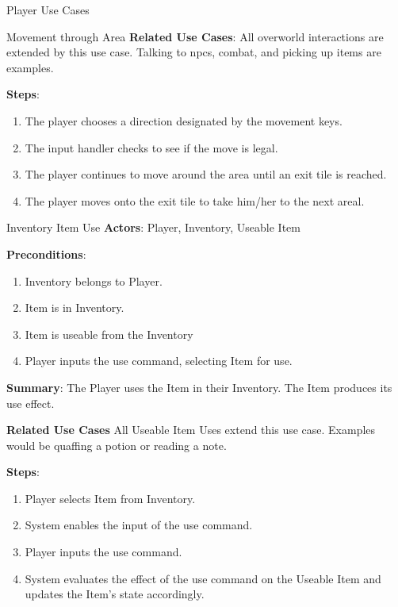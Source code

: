 \documentclass[12pt]{report}
\begin{document}
\begin{section}{Player Use Cases}
\begin{subsection}{Movement through Area}
      \textbf{Related Use Cases}:
      All overworld interactions are extended by this use case. Talking to npcs, combat, and picking up items are examples.

      \textbf{Steps}:
      \begin{enumerate}
        \item The player chooses a direction designated by the movement keys.
        \item The input handler checks to see if the move is legal.
        \item The player continues to move around the area until an exit tile is reached.
        \item The player moves onto the exit tile to take him/her to the next areal.
      \end{enumerate}
    \end{subsection}
    
    \begin{subsection}{Inventory Item Use}
      \textbf{Actors}:
      Player, Inventory, Useable Item

      \textbf{Preconditions}:
      \begin{enumerate}
      	\item Inventory belongs to Player.
      	\item Item is in Inventory.
      	\item Item is useable from the Inventory
      	\item Player inputs the use command, selecting Item for use.
      \end{enumerate}

      \textbf{Summary}:
      The Player uses the Item in their Inventory. The Item produces its
      use effect.

      \textbf{Related Use Cases}
      All Useable Item Uses extend this use case. Examples would be quaffing
      a potion or reading a note.

      \textbf{Steps}:
      \begin{enumerate}
        \item Player selects Item from Inventory.
        \item System enables the input of the use command.
        \item Player inputs the use command.
        \item System evaluates the effect of the use command on the
        Useable Item and updates the Item's state accordingly.
      \end{enumerate}
    \end{subsection}



\end{section}
\end{document}
